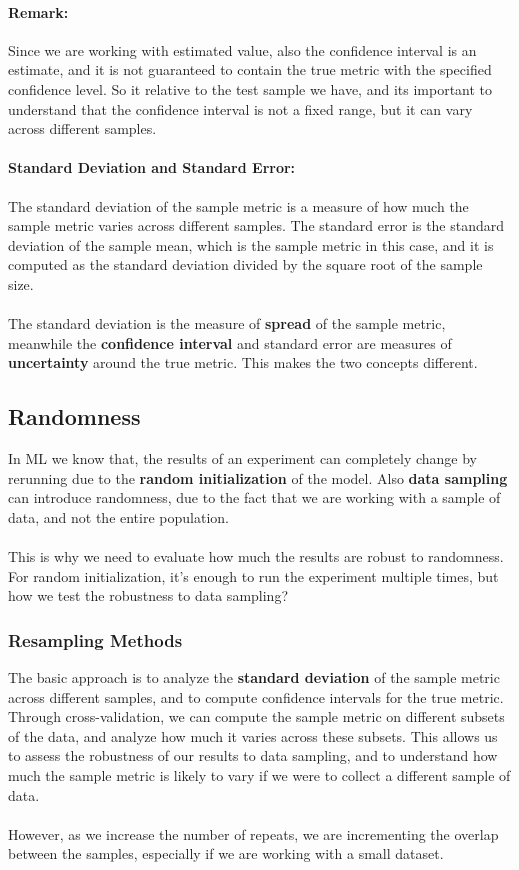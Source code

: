 \paragraph{Remark:} Since we are working with estimated value, also the confidence interval is an estimate, and it is not guaranteed to contain the true metric with the specified confidence level.
So it relative to the test sample we have, and its important to understand that the confidence interval is not a fixed range, but it can vary across different samples.

\paragraph{Standard Deviation and Standard Error:} 
The standard deviation of the sample metric is a measure of how much the sample metric varies across different samples.
The standard error is the standard deviation of the sample mean, which is the sample metric in this case, and it is computed as the standard deviation divided by the square root of the sample size.
\\\\
The standard deviation is the measure of \textbf{spread} of the sample metric, meanwhile the \textbf{confidence interval} and standard error are measures of \textbf{uncertainty} around the true metric.
This makes the two concepts different.

\subsection{Randomness}
In ML we know that, the results of an experiment can completely change by rerunning due to the \textbf{random initialization} of the model.
Also \textbf{data sampling} can introduce randomness, due to the fact that we are working with a sample of data, and not the entire population.
\\\\
This is why we need to evaluate how much the results are robust to randomness.
For random initialization, it's enough to run the experiment multiple times, but how we test the robustness to data sampling?

\subsubsection{Resampling Methods}
The basic approach is to analyze the \textbf{standard deviation} of the sample metric across different samples, and to compute confidence intervals for the true metric.
Through cross-validation, we can compute the sample metric on different subsets of the data, and analyze how much it varies across these subsets.
This allows us to assess the robustness of our results to data sampling, and to understand how much the sample metric is likely to vary if we were to collect a different sample of data.
\\\\
However, as we increase the number of repeats, we are incrementing the overlap between the samples, especially if we are working with a small dataset.

